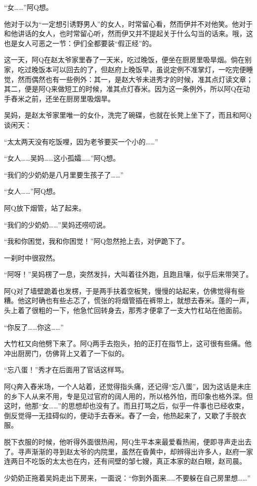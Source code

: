 \documentclass[12pt,UTF8]{ctexbook}
\begin{document}
“女……”阿Q想。

他对于以为“一定想引诱野男人”的女人，时常留心看，然而伊并不对他笑。他对于和他讲话的女人，也时常留心听，然而伊又并不提起关于什么勾当的话来。哦，这也是女人可恶之一节：伊们全都要装“假正经”的。

这一天，阿Q在赵太爷家里舂了一天米，吃过晚饭，便坐在厨房里吸旱烟。倘在别家，吃过晚饭本可以回去的了，但赵府上晚饭早，虽说定例不准掌灯，一吃完便睡觉，然而偶然也有一些例外：其一，是赵大爷未进秀才的时候，准其点灯读文章；其二，便是阿Q来做短工的时候，准其点灯舂米。因为这一条例外，所以阿Q在动手舂米之前，还坐在厨房里吸烟旱。

吴妈，是赵太爷家里唯一的女仆，洗完了碗碟，也就在长凳上坐下了，而且和阿Q谈闲天：

“太太两天没有吃饭哩，因为老爷要买一个小的……”

“女人……吴妈……这小孤孀……”阿Q想。

“我们的少奶奶是八月里要生孩子了……”

“女人……”阿Q想。

阿Q放下烟管，站了起来。

“我们的少奶奶……”吴妈还唠叨说。

“我和你困觉，我和你困觉！”阿Q忽然抢上去，对伊跪下了。

一刹时中很寂然。

“阿呀！”吴妈楞了一息，突然发抖，大叫着往外跑，且跑且嚷，似乎后来带哭了。

阿Q对了墙壁跪着也发楞，于是两手扶着空板凳，慢慢的站起来，仿佛觉得有些糟。他这时确也有些忐忑了，慌张的将烟管插在裤带上，就想去舂米。蓬的一声，头上着了很粗的一下，他急忙回转身去，那秀才便拿了一支大竹杠站在他面前。

“你反了……你这……”

大竹杠又向他劈下来了。阿Q两手去抱头，拍的正打在指节上，这可很有些痛。他冲出厨房门，仿佛背上又着了一下似的。

“忘八蛋！”秀才在后面用了官话这样骂。

阿Q奔入舂米场，一个人站着，还觉得指头痛，还记得“忘八蛋”，因为这话是未庄的乡下人从来不用，专是见过官府的阔人用的，所以格外怕，而印象也格外深。但这时，他那“女……”的思想却也没有了。而且打骂之后，似乎一件事也已经收束，倒反觉得一无挂碍似的，便动手去舂米。舂了一会，他热起来了，又歇了手脱衣服。

脱下衣服的时候，他听得外面很热闹，阿Q生平本来最爱看热闹，便即寻声走出去了。寻声渐渐的寻到赵太爷的内院里，虽然在昏黄中，却辨得出许多人，赵府一家连两日不吃饭的太太也在内，还有间壁的邹七嫂，真正本家的赵白眼，赵司晨。

少奶奶正拖着吴妈走出下房来，一面说：“你到外面来……不要躲在自己房里想……”
\end{document}
